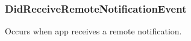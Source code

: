 \subsubsection[{Did\+Receive\+Remote\+Notification\+Event}]{ Did\+Receive\+Remote\+Notification\+Event\hspace{0.3cm}{\ttfamily [static]}}\label{class_voxel_busters_1_1_native_plugins_1_1_notification_service_afe03cd020860a6733c2262133e082610}


Occurs when app receives a remote notification. 

